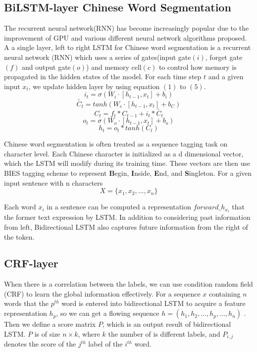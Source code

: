 \documentclass[conference]{IEEEtran}
\begin{document}
\subsection{BiLSTM-layer Chinese Word Segmentation}
The recurrent neural network(RNN) has become increasingly popular due to the improvement of GPU and various different neural network algorithms proposed.  A  a single layer, left to right LSTM for Chinese word segmentation is a recurrent neural network (RNN) which uses a series of gates(input gate$(i)$, forget gate$(f)$ and output gate$(o)$) and  memory cell$(c)$ to control how memory is propagated in the hidden states of the model. For each time step $t$ and a given input $x_t$, we update hidden layer by using equation $(1)$ to $(5)$.
\begin{equation}
i_t=\sigma(W_i \cdot[h_{t-1},x_t] + b_i )\label{eq}
\end{equation}
\begin{equation}
\widetilde{C_t}=tanh(W_c\cdot[h_{t-1},x_t] +b_C)\label{eq}
\end{equation}
\begin{equation}
C_t=f_t\ast C_{t-1}+i_t\ast \widetilde{C_t}\label{eq}
\end{equation}
\begin{equation}
o_t=\sigma(W_o \cdot[h_{t-1},x_t] + b_o )\label{eq}
\end{equation}
\begin{equation}
h_t=o_t\ast tanh(C_t)\label{eq}
\end{equation}

Chinese word segmentation is often treated as a sequence tagging task on character level. Each Chinese character is initialized as a d dimensional vector, which the LSTM will modify during its training time. These vectors are then use BIES tagging scheme to represent \textbf{B}egin, \textbf{I}nside, \textbf{E}nd, and \textbf{S}ingleton. For a given input sentence with n characters 
$$X = \{x_1,x_2,..., x_n\}$$

Each word $x_i$ in a sentence can be computed a representation $forward\_h_{x_i}$ that the former text expression by LSTM. In addition to considering past information from left, Bidirectional LSTM also captures future information from the right of the token.

\subsection{CRF-layer}
When there is a correlation between the labels, we can use condition random field (CRF) to learn the global information effectively.  For a sequence $x$ containing $n$ words that the $p^{th} $ word is entered into bidirectional LSTM to acquire a feature representation $h_p$, so we can get a flowing sequence $h=(h_1,h_2,...,h_p,...,h_n)$ . Then we define a score matrix $P$, which is an output result of bidirectional LSTM. $P$ is of size $n\times k$, where $k$ the number of is different labels, and $P_{i,j}$ denotes the score of the $j^{th}$ label of the $i^{th}$ word.
\end{document}
